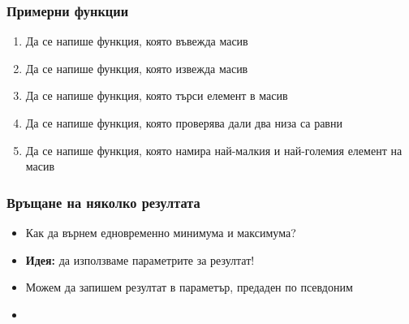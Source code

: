 \documentclass{beamer}
\begin{document}
\begin{frame}
  \frametitle{Примерни функции}

  \begin{enumerate}
  \item Да се напише функция, която въвежда масив
  \item Да се напише функция, която извежда масив
  \item Да се напише функция, която търси елемент в масив
  \item Да се напише функция, която проверява дали два низа са равни
  \item Да се напише функция, която намира най-малкия и най-големия елемент на масив
  \end{enumerate}
\end{frame}

\begin{frame}
  \frametitle{Връщане на няколко резултата}

  \begin{itemize}[<+->]
  \item Как да върнем едновременно минимума и максимума?
  \item \textbf{Идея:} да използваме параметрите за резултат!
  \item Можем да запишем резултат в параметър, предаден по псевдоним
  \item {}
  \end{itemize}
\end{frame}
\end{document}
